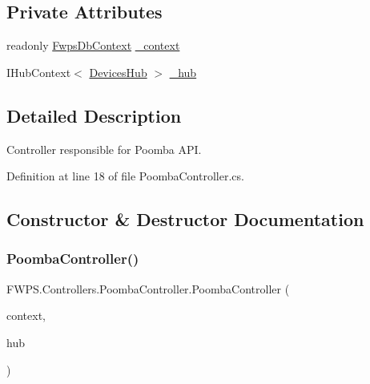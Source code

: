 \subsection*{Private Attributes}
\begin{DoxyCompactItemize}
\item 
readonly \mbox{\hyperlink{class_f_w_p_s_1_1_data_1_1_fwps_db_context}{Fwps\+Db\+Context}} \mbox{\hyperlink{class_f_w_p_s_1_1_controllers_1_1_poomba_controller_a0a919104421ece4773c74014fd9e1785}{\+\_\+context}}
\item 
I\+Hub\+Context$<$ \mbox{\hyperlink{class_f_w_p_s_1_1_devices_hub}{Devices\+Hub}} $>$ \mbox{\hyperlink{class_f_w_p_s_1_1_controllers_1_1_poomba_controller_a3afa7e57e7325eb2a6a0c478a0fc202b}{\+\_\+hub}}
\end{DoxyCompactItemize}


\subsection{Detailed Description}
Controller responsible for Poomba A\+PI. 

Definition at line 18 of file Poomba\+Controller.\+cs.



\subsection{Constructor \& Destructor Documentation}
\mbox{\label{class_f_w_p_s_1_1_controllers_1_1_poomba_controller_a52de14a00e6ea494725efbdc2eeb2462}} 
\subsubsection{\texorpdfstring{Poomba\+Controller()}{PoombaController()}}
{\footnotesize\ttfamily F\+W\+P\+S.\+Controllers.\+Poomba\+Controller.\+Poomba\+Controller (\begin{DoxyParamCaption}\item[{\mbox{\hyperlink{class_f_w_p_s_1_1_data_1_1_fwps_db_context}{Fwps\+Db\+Context}}}]{context,  }\item[{I\+Hub\+Context$<$ \mbox{\hyperlink{class_f_w_p_s_1_1_devices_hub}{Devices\+Hub}} $>$}]{hub }\end{DoxyParamCaption})}



